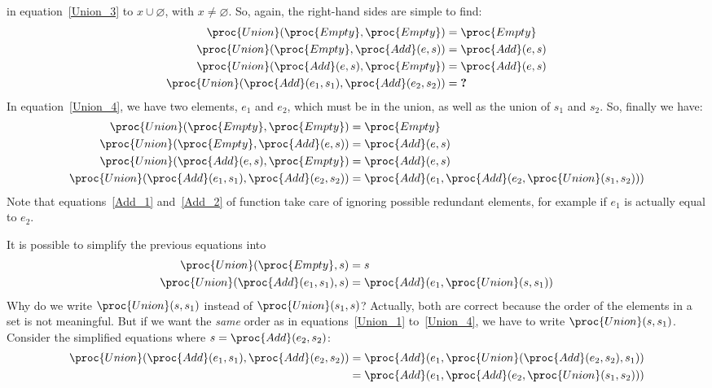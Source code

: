    in equation~\ref{Union_3} to \(x \cup \varnothing\), with
   \(x \neq \varnothing\). So, again, the right-hand sides are
   simple to find:
   \begin{align*}
        \proc{Union} (\proc{Empty}, \proc{Empty}) 
     &= \proc{Empty}\\
        \proc{Union} (\proc{Empty}, \proc{Add} (e, s))
     &= \proc{Add} (e, s)\\
        \proc{Union} (\proc{Add} (e, s), \proc{Empty})
     &= \proc{Add} (e, s)\\
        \proc{Union} (\proc{Add} (e_1, s_1), 
                      \proc{Add} (e_2, s_2))
     &= \textbf{?}
   \end{align*}
   In equation~\ref{Union_4}, we have two elements, \(e_1\) and
   \(e_2\), which must be in the union, as well as the union of
   \(s_1\) and \(s_2\). So, finally we have:
   \begin{align*}
        \proc{Union} (\proc{Empty}, \proc{Empty}) 
     &= \proc{Empty}\\
        \proc{Union} (\proc{Empty}, \proc{Add} (e, s))
     &= \proc{Add} (e, s)\\
        \proc{Union} (\proc{Add} (e, s), \proc{Empty})
     &= \proc{Add} (e, s)\\
        \proc{Union} (\proc{Add} (e_1, s_1), 
                      \proc{Add} (e_2, s_2))
     &= \proc{Add} (e_1, \proc{Add} (e_2, \proc{Union}
                      (s_1, s_2)))
   \end{align*}
   Note that equations~\ref{Add_1} and~\ref{Add_2} of function
    take care of ignoring possible redundant elements, for
   example if \(e_1\) is actually equal to \(e_2\).

   It is possible to simplify the previous equations into
   \begin{align*}
        \proc{Union} (\proc{Empty}, s) 
     &= s\\
        \proc{Union} (\proc{Add} (e_1, s_1), s)
     &= \proc{Add} (e_1, \proc{Union} (s, s_1))
   \end{align*}
   Why do we write \(\proc{Union} (s, s_1)\) instead of
   \(\proc{Union} (s_1, s)\)? Actually, both are correct
   because the order of the elements in a set is not meaningful. But
   if we want the \emph{same} order as in equations~\ref{Union_1}
   to~\ref{Union_4}, we have to write \(\proc{Union} (s,
   s_1)\). Consider the simplified equations where \(s =
   \proc{Add} (e_2, s_2)\):
   \begin{align*}
        \proc{Union} (\proc{Add} (e_1, s_1), \proc{Add}
        (e_2, s_2))
     &= \proc{Add} (e_1, \proc{Union} (\proc{Add} (e_2,
        s_2), s_1))\\
     &= \proc{Add} (e_1, \proc{Add} (e_2, \proc{Union}
        (s_1, s_2)))
   \end{align*}

